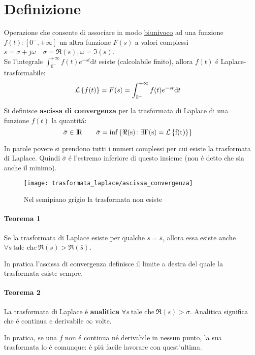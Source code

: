 \documentclass[../main.tex]{subfiles}
\begin{document}
	\section{Definizione}
	\label{sec:trasformata_laplace}
		Operazione che consente di associare in modo \underline{biunivoco} ad una funzione $ f(t):\left[ 0^{-}, + \infty \right] $ un altra funzione $ F(s) $ a valori complessi $ s = \sigma + j\omega \quad \sigma=\Re(s), \omega=\Im(s) $.\\
		\linebreak
		Se l'integrale $ \int_{0^{-}}^{+\infty}f(t)e^{-st} \mathrm{d}t $ esiste (calcolabile finito), allora $f(t)$ \'e Laplace-trasformabile:
		\[ 
			\mathcal{L} \left\lbrace f(t) \right\rbrace = F(s) = \int_{0^{-}}^{+\infty} f(t) e^{- s t} \mathrm{d} t
		\]
		
		\begin{definition}			
			Si definisce \textbf{ascissa di convergenza} per la trasformata di Laplace di una funzione $ f(t) $ la quantit\'a:
			\[
				\bar{\sigma} \in \rm I\!R \qquad \bar{\sigma} = inf\left\lbrace \Re{(s)} \colon \exists F(s) = \mathcal{L} \left\lbrace f(t) \right\rbrace \right\rbrace
			\]
		\end{definition}
		In parole povere si prendono tutti i numeri complessi per cui esiste la trasformata di Laplace. Quindi $ \bar{\sigma} $ \'e l'estremo inferiore di questo insieme (non \'e detto che sia anche il minimo).
		\begin{figure}[H]
			\centering\texttt{[image: trasformata\_laplace/ascissa\_convergenza]}
			\caption{Nel semipiano grigio la trasformata non esiste}
		\end{figure}
		
		\paragraph{Teorema 1} Se la trasformata di Laplace esiste per qualche $ s=\bar{s} $, allora essa esiste anche $ \forall s\ \text{tale che}\ \Re(s) > \Re(\bar{s}) $.
		
		In pratica l'ascissa di convergenza definisce il limite a destra del quale la trasformata esiste sempre.
		
		\paragraph{Teorema 2} La trasformata di Laplace \'{e} \textbf{analitica} $ \forall s\ \text{tale che}\ \Re(s) > \bar{\sigma} $. Analitica significa che \'e continua e derivabile $ \infty $ volte.
		
		In pratica, se una $ f $ non \'e continua n\'e derivabile in nessun punto, la sua trasformata lo \'e comunque: \'e pi\'u facile lavorare con quest'ultima.
		
\end{document}
